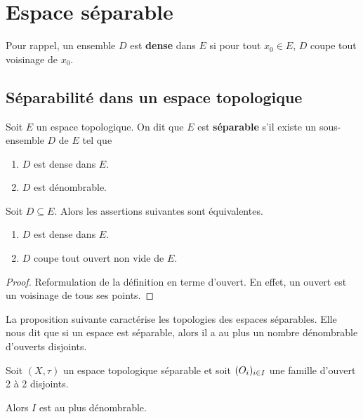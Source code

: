 \chapter{Espace séparable}

Pour rappel, un ensemble $D$ est \textbf{dense} dans $E$ si pour tout $x_{0} \in E$, $D$
coupe tout voisinage de $x_{0}$.

\section{Séparabilité dans un espace topologique}

\begin{definition}
	Soit $E$ un espace topologique.
	On dit que $E$ est \textbf{séparable} s'il existe un sous-ensemble $D$ de
	$E$ tel que
	\begin{enumerate}
		\item $D$ est dense dans $E$.
		\item $D$ est dénombrable.
	\end{enumerate}
\end{definition}

\begin{proposition}
	Soit $D \subseteq E$.
	Alors les assertions suivantes sont équivalentes.
	\begin{enumerate}
		\item $D$ est dense dans $E$.
		\item $D$ coupe tout ouvert non vide de $E$.
	\end{enumerate}
\end{proposition}

\ifdefined\outputproof
\begin{proof}
	Reformulation de la définition en terme d'ouvert. En effet, un ouvert est un
	voisinage de tous ses points.
\end{proof}
\fi

La proposition suivante caractérise les topologies des espaces séparables. Elle
nous dit que si un espace est séparable, alors il a au plus un nombre
dénombrable d'ouverts disjoints.

\begin{proposition}
	Soit $(X, \tau)$ un espace topologique séparable et soit $(O_{i})_{i \in I}$ une famille d'ouvert
	2 à 2 disjoints.

	Alors $I$ est au plus dénombrable.
\end{proposition}

